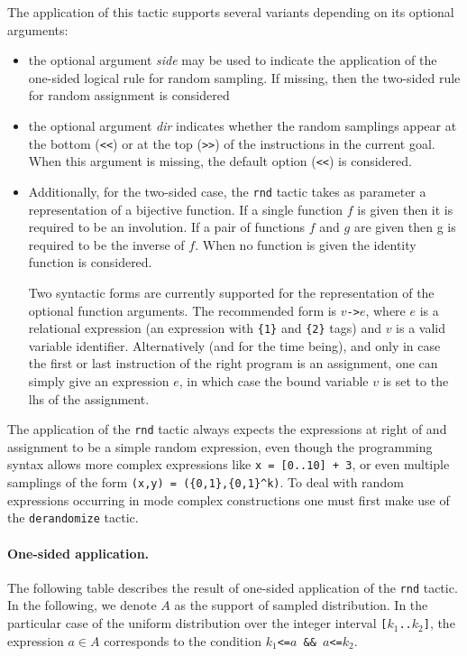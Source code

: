 \Description
The application of this tactic supports several variants depending on
its optional arguments:
\begin{itemize}
  \item the optional argument \textit{side} may be used to indicate
    the application of the one-sided logical rule for random
    sampling. If missing, then the two-sided rule for random
    assignment is considered 
  \item the optional argument \textit{dir} indicates whether the
    random samplings appear at the bottom (\verb+<<+) or at the top
    (\verb+>>+) of the instructions in the current goal. When this
    argument is missing, the default option (\verb+<<+) is considered. 
  \item Additionally, for the two-sided case, the \verb+rnd+ tactic
    takes as parameter a representation of a bijective function. If a
    single function $f$ is given then it is required to be an
    involution. If a pair of functions $f$ and $g$ are given then g is
    required to be the inverse of $f$. 
    When no function is given the identity function is considered.

    Two syntactic forms are currently supported for the representation
    of the optional function arguments. The recommended form is
    $v$\verb+->+$e$, where $e$ is a relational expression (an
    expression with \verb+{1}+ and \verb+{2}+ tags) and $v$ is a valid
    variable identifier. Alternatively (and for the time being), and
    only in case the first or last instruction of the right program is
    an assignment, one can simply give an expression $e$, in which
    case the bound variable $v$ is set to the lhs of the assignment.

\end{itemize}

The application of the \verb+rnd+ tactic always expects the
expressions at right of and assignment to be a simple random
expression, even though the programming syntax allows more complex
expressions like \verb?x = [0..10] + 3?, or even multiple samplings of
the form \verb+(x,y) = ({0,1},{0,1}^k)+. To deal with random
expressions occurring in mode complex constructions one must first
make use of the \verb+derandomize+ tactic.

\paragraph*{One-sided application.}
The following table describes the result of one-sided application of
the \verb+rnd+ tactic. In the following, we denote $A$ as the support
of sampled distribution. In the particular case of the uniform
distribution over the integer interval \texttt{[$k_1$..$k_2$]}, the
expression $a\in A$ corresponds to the condition \texttt{$k_1$<=$a$ \&\&
  $a$<=$k_2$}.

